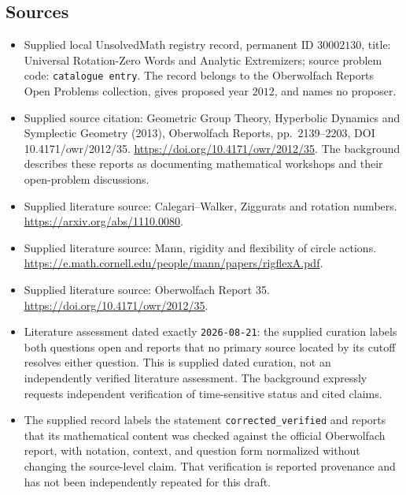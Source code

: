 \documentclass[11pt]{article}
\begin{document}
\subsection{Sources}
\begin{itemize}
\item Supplied local UnsolvedMath registry record, permanent ID $30002130$, title: Universal Rotation-Zero Words and Analytic Extremizers; source problem code: \texttt{catalogue entry}. The record belongs to the Oberwolfach Reports Open Problems collection, gives proposed year $2012$, and names no proposer.
\item Supplied source citation: Geometric Group Theory, Hyperbolic Dynamics and Symplectic Geometry (2013), Oberwolfach Reports, pp.\ 2139--2203, DOI 10.4171/owr/2012/35. \url{https://doi.org/10.4171/owr/2012/35}. The background describes these reports as documenting mathematical workshops and their open-problem discussions.
\item Supplied literature source: Calegari--Walker, Ziggurats and rotation numbers. \url{https://arxiv.org/abs/1110.0080}.
\item Supplied literature source: Mann, rigidity and flexibility of circle actions. \url{https://e.math.cornell.edu/people/mann/papers/rigflexA.pdf}.
\item Supplied literature source: Oberwolfach Report 35. \url{https://doi.org/10.4171/owr/2012/35}.
\item Literature assessment dated exactly \texttt{2026-08-21}: the supplied curation labels both questions open and reports that no primary source located by its cutoff resolves either question. This is supplied dated curation, not an independently verified literature assessment. The background expressly requests independent verification of time-sensitive status and cited claims.
\item The supplied record labels the statement \texttt{corrected\_verified} and reports that its mathematical content was checked against the official Oberwolfach report, with notation, context, and question form normalized without changing the source-level claim. That verification is reported provenance and has not been independently repeated for this draft.
\end{itemize}
\end{document}
